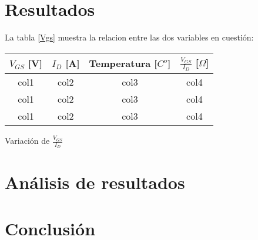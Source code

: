 \documentclass[]{article}
\makeatletter
\newenvironment{tablehere}    %
  {\def\@captype{table}}    %
  {}              %
\makeatother
\begin{document}
\begin{multicols}{2}
\section{Resultados}

La tabla \ref{Vgs} muestra la relacion entre las dos variables en cuestión:

\begin{tablehere}
\begin{center}
\begin{tabular}{|c|c|c|c|}
\hline
$V_{GS}$ [V] & $I_{D}$ [A] & Temperatura [$C^{o}$] & $\frac{V_{GS}}{I_D}$ [$\Omega$] \\ 
\hline
col1 & col2 & col3 & col4 \\

col1 & col2 & col3 & col4 \\

col1 & col2 & col3 & col4 \\
\hline
\end{tabular}
\caption{Variación de $\frac{V_{GS}}{I_D}$}
\label{Vgs}
\end{center}
\end{tablehere}
\lipsum[1]


\section{Análisis de resultados}
\lipsum[1]
\section{Conclusión}
\lipsum[1]

\printbibliography 
\end{multicols}
 
\end{document}
